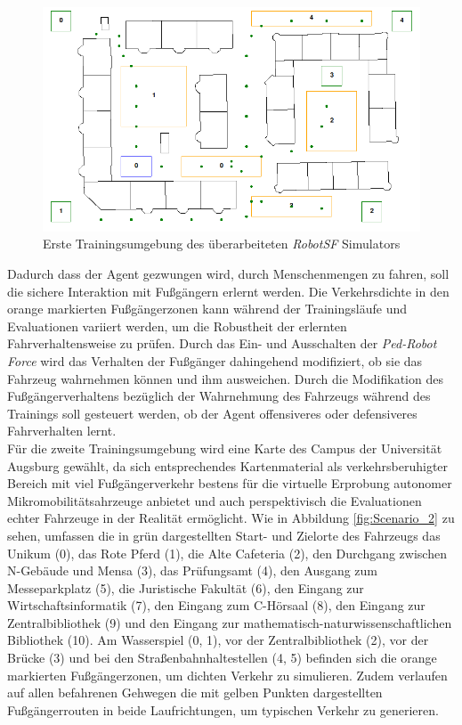 \begin{figure}[h]
  \centering
  \includegraphics[width = 1.0\textwidth]{imgs/small_map}
  \caption{Erste Trainingsumgebung des überarbeiteten \emph{RobotSF} Simulators}
  \label{fig:Scenario_1}
\end{figure}

Dadurch dass der Agent gezwungen wird, durch Menschenmengen zu fahren, soll die sichere
Interaktion mit Fußgängern erlernt werden. Die Verkehrsdichte in den orange markierten
Fußgängerzonen kann während der Trainingsläufe und Evaluationen variiert werden, um die
Robustheit der erlernten Fahrverhaltensweise zu prüfen. Durch das Ein- und Ausschalten
der \emph{Ped-Robot Force} wird das Verhalten der Fußgänger dahingehend modifiziert,
ob sie das Fahrzeug wahrnehmen können und ihm ausweichen. Durch die Modifikation des
Fußgängerverhaltens bezüglich der Wahrnehmung des Fahrzeugs während des Trainings soll
gesteuert werden, ob der Agent offensiveres oder defensiveres Fahrverhalten lernt.\\

Für die zweite Trainingsumgebung wird eine Karte des Campus der Universität Augsburg
gewählt, da sich entsprechendes Kartenmaterial als verkehrsberuhigter Bereich mit viel
Fußgängerverkehr bestens für die virtuelle Erprobung autonomer Mikromobilitätsahrzeuge
anbietet und auch perspektivisch die Evaluationen echter Fahrzeuge in der Realität ermöglicht.
Wie in Abbildung \ref{fig:Scenario_2} zu sehen, umfassen die in grün dargestellten Start- und
Zielorte des Fahrzeugs das Unikum (0), das Rote Pferd (1), die Alte Cafeteria (2),
den Durchgang zwischen N-Gebäude und Mensa (3), das Prüfungsamt (4), den Ausgang zum
Messeparkplatz (5), die Juristische Fakultät (6), den Eingang zur Wirtschaftsinformatik (7),
den Eingang zum C-Hörsaal (8), den Eingang zur Zentralbibliothek (9) und den Eingang zur
mathematisch-naturwissenschaftlichen Bibliothek (10).
Am Wasserspiel (0, 1), vor der Zentralbibliothek (2), vor der Brücke (3) und bei den
Straßenbahnhaltestellen (4, 5) befinden sich die orange markierten Fußgängerzonen, um dichten
Verkehr zu simulieren. Zudem verlaufen auf allen befahrenen Gehwegen die mit gelben Punkten
dargestellten Fußgängerrouten in beide Laufrichtungen, um typischen Verkehr zu generieren.\\


